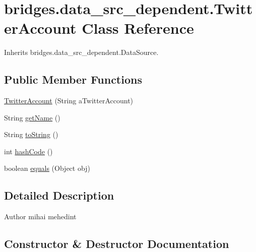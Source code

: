 \hypertarget{classbridges_1_1data__src__dependent_1_1_twitter_account}{}\section{bridges.\+data\+\_\+src\+\_\+dependent.\+Twitter\+Account Class Reference}
\label{classbridges_1_1data__src__dependent_1_1_twitter_account}


Inherits bridges.\+data\+\_\+src\+\_\+dependent.\+Data\+Source.

\subsection*{Public Member Functions}
\begin{DoxyCompactItemize}
\item 
\hyperlink{classbridges_1_1data__src__dependent_1_1_twitter_account_a725febd1fcbbee710fd638d6b4a9db62}{Twitter\+Account} (String a\+Twitter\+Account)
\item 
String \hyperlink{classbridges_1_1data__src__dependent_1_1_twitter_account_a92c536bd6a65c51d84a77d772775e20c}{get\+Name} ()
\item 
String \hyperlink{classbridges_1_1data__src__dependent_1_1_twitter_account_af4dd5dfe1a1556fa57f917fb24d8d6f2}{to\+String} ()
\item 
int \hyperlink{classbridges_1_1data__src__dependent_1_1_twitter_account_a2f89f6f336b1bd39f0cf3aa444c76885}{hash\+Code} ()
\item 
boolean \hyperlink{classbridges_1_1data__src__dependent_1_1_twitter_account_a2bddc8fe99b9096fe90968d805fa91e1}{equals} (Object obj)
\end{DoxyCompactItemize}


\subsection{Detailed Description}
\begin{DoxyAuthor}{Author}
mihai mehedint 
\end{DoxyAuthor}


\subsection{Constructor \& Destructor Documentation}
\hypertarget{classbridges_1_1data__src__dependent_1_1_twitter_account_a725febd1fcbbee710fd638d6b4a9db62}{}
